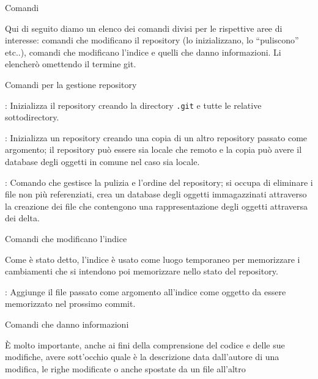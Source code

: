 \capitolo Comandi

Qui di seguito diamo un elenco dei comandi divisi per le rispettive aree di
interesse: comandi che modificano il repository (lo inizializzano, lo
``puliscono'' etc..), comandi che modificano l'indice e quelli che danno
informazioni. Li elencher\`o omettendo il termine git.

\sezione Comandi per la gestione repository

\elemento {}: Inizializza il repository creando la directory {\tt .git}
e tutte le relative sottodirectory.

\elemento {}: Inizializza un repository creando una copia di un altro
repository passato come argomento; il repository pu\`o essere sia locale che
remoto e la copia pu\`o avere il database degli oggetti in comune nel caso sia
locale.

\elemento {}: Comando che gestisce la pulizia e l'ordine del repository;
si occupa di eliminare i file non pi\`u referenziati, crea un database degli
oggetti immagazzinati attraverso la creazione dei file  che
contengono una rappresentazione degli oggetti attraversa dei delta.

\sezione Comandi che modificano l'indice

Come \`e stato detto, l'indice \`e usato come luogo temporaneo per memorizzare i
cambiamenti che si intendono poi memorizzare nello stato del repository.

\elemento{}: Aggiunge il file passato come argomento all'indice come
oggetto da essere memorizzato nel prossimo commit.

\sezione Comandi che danno informazioni

\`E molto importante, anche ai fini della comprensione del codice e delle sue
modifiche, avere sott'occhio quale \`e la descrizione data dall'autore di una
modifica, le righe modificate o anche spostate da un file all'altro
